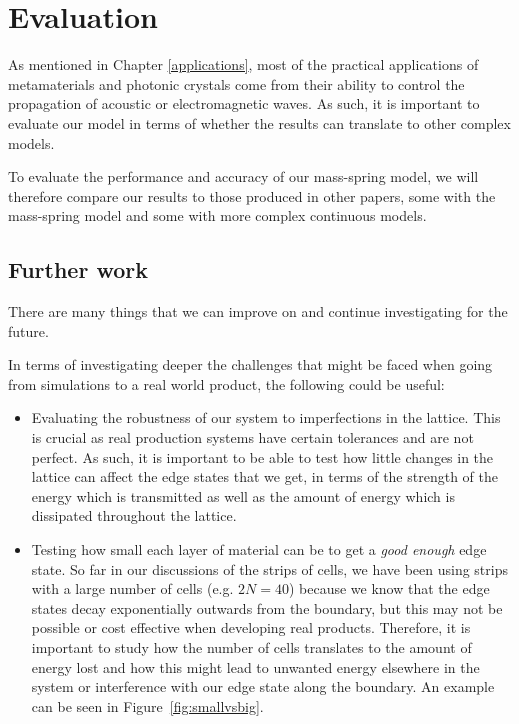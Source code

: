 \chapter{Evaluation}
As mentioned in Chapter \ref{applications}, most of the practical applications
of metamaterials and photonic crystals come from their ability to control the
propagation of acoustic or electromagnetic waves. As such, it is important to
evaluate our model in terms of whether the results can translate to other
complex models.

To evaluate the performance and accuracy of our mass-spring model, we will
therefore compare our results to those produced in other papers, some with the
mass-spring model and some with more complex continuous models.


\section{Further work}
There are many things that we can improve on and continue investigating for the
future. 

In terms of investigating deeper the challenges that might be faced when going
from simulations to a real world product, the following could be useful:
\begin{itemize}
\item Evaluating the robustness of our system to imperfections in the lattice.
This is crucial as real production systems have certain tolerances and are not
perfect. As such, it is important to be able to test how little changes in the
lattice can affect the edge states that we get, in terms of the strength of the
energy which is transmitted as well as the amount of energy which is dissipated
throughout the lattice.

\item Testing how small each layer of material can be to get a \textit{good
enough} edge state. So far in our discussions of the strips of cells, we have
been using strips with a large number of cells (e.g. $2N=40$) because we know
that the edge states decay exponentially outwards from the boundary, but this
may not be possible or cost effective when developing real products. Therefore,
it is important to study how the number of cells translates to the amount of
energy lost and how this might lead to unwanted energy elsewhere in the system
or interference with our edge state along the boundary. An example can be seen
in Figure~\ref{fig:smallvsbig}.
\end{itemize}

